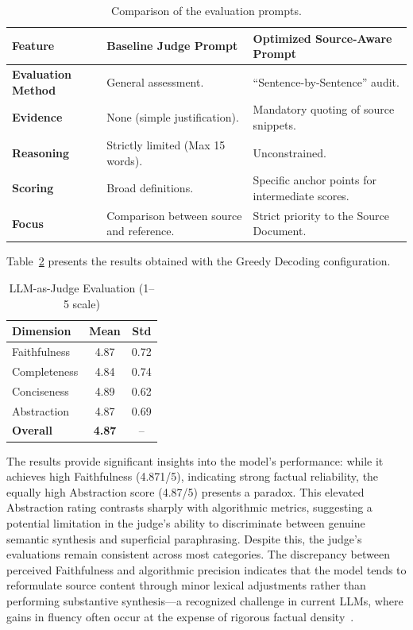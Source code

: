 \documentclass[conference]{IEEEtran}
\begin{document}
\begin{table}[h]
\centering
\small %
\begin{tabularx}{\columnwidth}{|l|X|X|} %
\hline
\textbf{Feature} & \textbf{Baseline Judge Prompt} & \textbf{Optimized Source-Aware Prompt} \\
\hline
\textbf{Evaluation Method} & General assessment. & ``Sentence-by-Sentence'' audit. \\
\hline
\textbf{Evidence} & None (simple justification). & Mandatory quoting of source snippets. \\
\hline
\textbf{Reasoning} & Strictly limited (Max 15 words). & Unconstrained. \\
\hline
\textbf{Scoring} & Broad definitions. & Specific anchor points for intermediate scores. \\
\hline
\textbf{Focus} & Comparison between source and reference. & Strict priority to the Source Document. \\
\hline
\end{tabularx}
\caption{Comparison of the evaluation prompts.}
\label{tab:prompt_evolution}
\end{table}

Table~\ref{tab:llm_judge} presents the results obtained with the Greedy Decoding configuration.
\begin{table}[htbp]
\caption{LLM-as-Judge Evaluation (1--5 scale)}
\begin{center}
\begin{tabular}{lcc}
\toprule
\textbf{Dimension} & \textbf{Mean} & \textbf{Std} \\
\midrule
Faithfulness & 4.87 &  0.72 \\
Completeness & 4.84 & 0.74 \\
Conciseness & 4.89 & 0.62 \\
Abstraction & 4.87 & 0.69 \\
\midrule
\textbf{Overall} & \textbf{4.87} & -- \\
\bottomrule
\end{tabular}
\label{tab:llm_judge}
\end{center}
\end{table}


The results provide significant insights into the model's performance: while it achieves high Faithfulness (4.871/5), indicating strong factual reliability, the equally high Abstraction score (4.87/5) presents a paradox. This elevated Abstraction rating contrasts sharply with algorithmic metrics, suggesting a potential limitation in the judge's ability to discriminate between genuine semantic synthesis and superficial paraphrasing. Despite this, the judge’s evaluations remain consistent across most categories. The discrepancy between perceived Faithfulness and algorithmic precision indicates that the model tends to reformulate source content through minor lexical adjustments rather than performing substantive synthesis—a recognized challenge in current LLMs, where gains in fluency often occur at the expense of rigorous factual density~\cite{ladhak2022faithful, tang2024faithfulness}.
\end{document}
